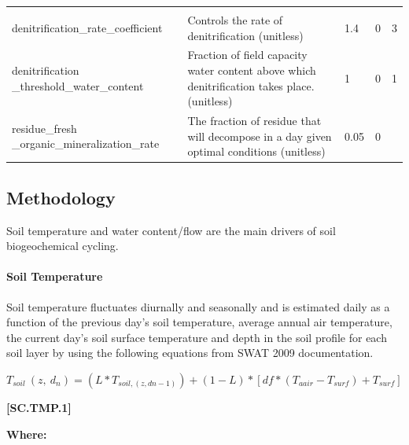 \begin{landscape}
\begin{longtable}{@{} L{5cm} L{10cm} L{1cm} L{1cm} L{1cm} @{}}
 &  &  &  &  \\
denitrification\_rate\_coefficient & Controls the rate of denitrification (unitless) & 1.4 & 0 & 3 \\
denitrification \_threshold\_water\_content & Fraction of field capacity water content above which denitrification takes place. (unitless) & 1 & 0 & 1 \\
residue\_fresh \_organic\_mineralization\_rate & The fraction of residue that will decompose in a day given optimal conditions (unitless) & 0.05 & 0 &  \\



\end{longtable}
\end{landscape}

\subsection{Methodology}
Soil temperature and water content/flow are the main drivers of soil biogeochemical cycling.

\paragraph{Soil Temperature}
\vspace{-0.25cm}

Soil temperature fluctuates diurnally and seasonally and is estimated daily as a function of the previous day’s soil temperature, average annual air temperature, the current day’s soil surface temperature and depth in the soil profile for each soil layer by using the following equations from SWAT 2009 documentation.

    \begin{center}
\(T_{soil}\ (z,\ d_n) = (L * T_{soil,(z,dn-1)})+(1-L) * [df * (T_{aair}-T_{surf}) +T_{surf}]\)
    \end{center}
        \vspace{0.5cm} 
    
            {\raggedleft \textbf{[SC.TMP.1]}\par}
            \vspace{0.5cm}

        \textbf{Where:}
        
